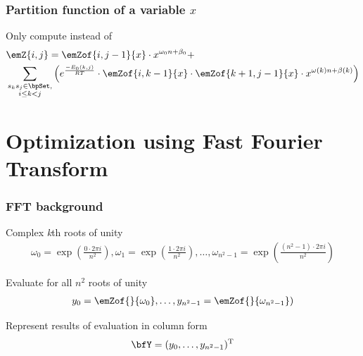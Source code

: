 \documentclass{beamer}
\begin{document}
\begin{frame}
  \frametitle{Partition function of a variable $x$}
  \begin{block}{Only compute  instead of }
  \begin{align*}
    \begin{split}
  & \emZ{i,j} = \emZof{i,j-1}{x} \cdot x^{ \omega_0n+\beta_0} + \\
  &\sum_{\substack{s_k s_j \in \bpSet,\\i\le k<j}}
  \left(e^{\frac{-E_0(k,j)}{RT}}\cdot
  \emZof{i,k-1}{x} \cdot \emZof{k+1,j-1}{x}\cdot x^{ \omega(k)n+\beta(k)} \right)
  \end{split}
  \end{align*}
  \end{block}
\end{frame}

\section{Optimization using Fast Fourier Transform}

\begin{frame}
  \frametitle{FFT background}
  \begin{block}{Complex {\em k}th roots of unity}
  \begin{align*}
   \omega_0=\exp(\frac{0\cdot 2\pi i}{n^2}), \omega_1=\exp(\frac{1\cdot 2\pi i}{n^2}),\dots, \omega_{n^2-1}=\exp(\frac{(n^2-1)\cdot 2\pi i}{n^2})
  \end{align*}
  \end{block}

  \begin{block}{Evaluate  for all $n^2$ roots of unity}
  \begin{align*}
  y_0=\emZof{}{ \omega_0},\dots,y_{n^2-1}=\emZof{}{ \omega_{n^2-1}})
  \end{align*}
  \end{block}

  \begin{block}{Represent results of evaluation in column form}
  \begin{align*}
    \bfY = (y_0,\dots,y_{n^2-1})^{\text T}
  \end{align*}
  \end{block}
\end{frame}
\end{document}
